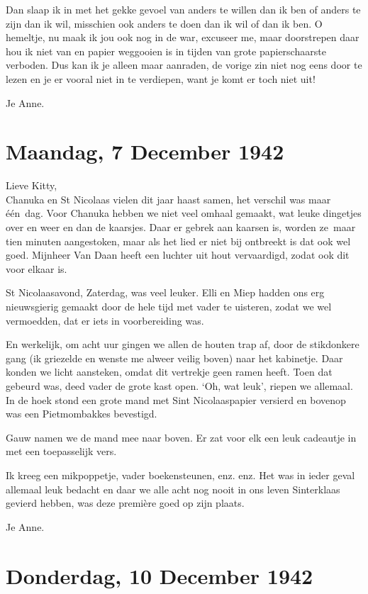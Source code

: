 \documentclass{book}
\begin{document}
Dan slaap ik in met het gekke gevoel van anders te willen dan ik ben of
anders te zijn dan ik wil, misschien ook anders te doen dan ik wil of
dan ik ben. O hemeltje, nu maak ik jou ook nog in de war, excuseer me,
maar doorstrepen daar hou ik niet van en papier weggooien is in tijden
van grote papierschaarste verboden. Dus kan ik je alleen maar aanraden,
de vorige zin niet nog eens door te lezen en je er vooral niet in te
verdiepen, want je komt er toch niet uit!

Je Anne.

\chapter{Maandag, 7 December 1942}

Lieve Kitty,\\Chanuka en St Nicolaas vielen dit jaar haast samen, het
verschil was maar één~dag. Voor Chanuka hebben we niet veel omhaal
gemaakt, wat leuke dingetjes over en weer en dan de kaarsjes. Daar er
gebrek aan kaarsen is, worden ze~maar tien minuten aangestoken, maar als
het lied er niet bij ontbreekt is dat ook wel goed. Mijnheer Van Daan
heeft een luchter uit hout vervaardigd, zodat ook dit voor elkaar is.

St Nicolaasavond, Zaterdag, was veel leuker. Elli en Miep hadden ons erg
nieuwsgierig gemaakt door de hele tijd met vader te uisteren, zodat we
wel vermoedden, dat er iets in voorbereiding was.

En werkelijk, om acht uur gingen we allen de houten trap af, door de
stikdonkere gang (ik griezelde en wenste me alweer veilig boven) naar
het kabinetje. Daar konden we licht aansteken, omdat dit vertrekje geen
ramen heeft. Toen dat gebeurd was, deed vader de grote kast open. `Oh,
wat leuk', riepen we allemaal. In de hoek stond een grote mand met Sint
Nicolaaspapier versierd en bovenop was een Pietmombakkes bevestigd.

Gauw namen we de mand mee naar boven. Er zat voor elk een leuk cadeautje
in met een toepasselijk vers.

Ik kreeg een mikpoppetje, vader boekensteunen, enz. enz. Het was in
ieder geval allemaal leuk bedacht en daar we alle acht nog nooit in ons
leven Sinterklaas gevierd hebben, was deze première goed op zijn plaats.

Je Anne.

\chapter{Donderdag, 10 December 1942}
\end{document}
